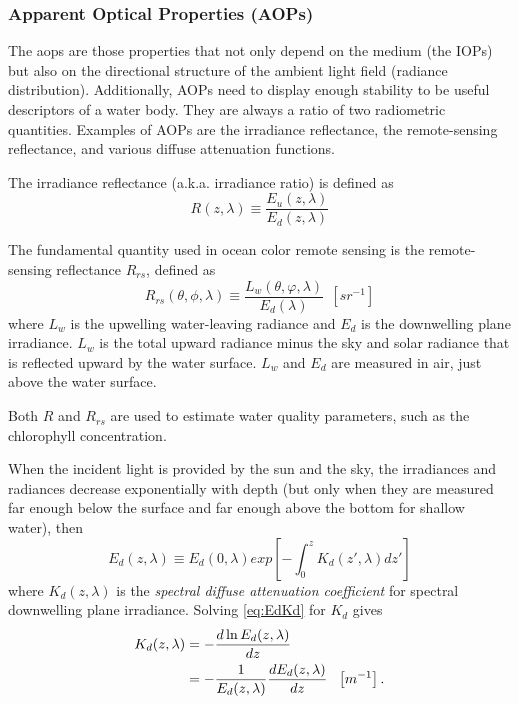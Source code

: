 \subsubsection*{Apparent Optical Properties (AOPs)}
The \gls{aops} are those properties that not only depend on the medium (the IOPs) but also on the directional structure of the ambient light field (radiance distribution). Additionally, AOPs need to display enough stability to be useful descriptors of a water body. They are always a ratio of two radiometric quantities. Examples of AOPs are the irradiance reflectance, the remote-sensing reflectance, and various diffuse attenuation functions.

The irradiance reflectance (a.k.a. irradiance ratio) is defined as
\begin{equation}
  R(z,\lambda)\equiv \frac{E_u(z,\lambda)}{E_d(z,\lambda)}
\end{equation}

The fundamental quantity used in ocean color remote sensing is the remote-sensing reflectance $R_{rs}$, defined as
\begin{equation}
  R_{rs}(\theta,\phi,\lambda)\equiv \frac{L_w(\theta,\varphi,\lambda)}{E_d(\lambda)}~~\left[sr^{-1} \right]
\end{equation}
where $L_w$ is the upwelling water-leaving radiance and $E_d$ is the downwelling plane irradiance. $L_w$ is the total upward radiance minus the sky and solar radiance that is reflected upward by the water surface. $L_w$ and $E_d$ are measured in air, just above the water surface.

Both $R$ and $R_{rs}$ are used to estimate water quality parameters, such as the chlorophyll concentration.

When the incident light is provided by the sun and the sky, the irradiances and radiances decrease exponentially with depth (but only when they are measured far enough below the surface and far enough above the bottom for shallow water), then
\begin{equation}\label{eq:EdKd}
  E_d(z,\lambda)\equiv E_d(0,\lambda) exp\left[-\int_0^{z}K_d(z',\lambda)dz'\right]
\end{equation}
where $K_d(z,\lambda)$ is the {\it spectral diffuse attenuation coefficient} for spectral downwelling plane irradiance. Solving \autoref{eq:EdKd} for $K_d$ gives
\begin{align}
  K_d(z,\lambda)  &=- \frac{d\ln E_d(z,\lambda)}{dz} \notag \\
          &=-\frac{1}{E_d(z,\lambda)}\frac{dE_d(z,\lambda)}{dz} ~~\left[m^{-1} \right].
\end{align}


